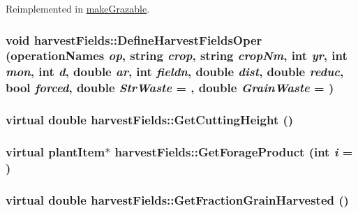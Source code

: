 Reimplemented in \hyperlink{classmake_grazable_a52ff627730636a7a71b975a203edbf5f}{makeGrazable}.\hypertarget{classharvest_fields_aed7f89142c895481212938562ce61f3a}{
\subsubsection[{DefineHarvestFieldsOper}]{\setlength{\rightskip}{0pt plus 5cm}void harvestFields::DefineHarvestFieldsOper ({\bf operationNames} {\em op}, \/  string {\em crop}, \/  string {\em cropNm}, \/  int {\em yr}, \/  int {\em mon}, \/  int {\em d}, \/  double {\em ar}, \/  int {\em fieldn}, \/  double {\em dist}, \/  double {\em reduc}, \/  bool {\em forced}, \/  double {\em StrWaste} = {}, \/  double {\em GrainWaste} = {})}}
\label{classharvest_fields_aed7f89142c895481212938562ce61f3a}
\hypertarget{classharvest_fields_a2f6612b8edd1ad8a89f5df4890b990c7}{
\subsubsection[{GetCuttingHeight}]{\setlength{\rightskip}{0pt plus 5cm}virtual double harvestFields::GetCuttingHeight ()}}
\label{classharvest_fields_a2f6612b8edd1ad8a89f5df4890b990c7}
\hypertarget{classharvest_fields_a8eea5e22cb934b9582c5bd168135390b}{
\subsubsection[{GetForageProduct}]{\setlength{\rightskip}{0pt plus 5cm}virtual {\bf plantItem}$\ast$ harvestFields::GetForageProduct (int {\em i} = {})}}
\label{classharvest_fields_a8eea5e22cb934b9582c5bd168135390b}
\hypertarget{classharvest_fields_adc76919fe377000c2c48276227cfd6ca}{
\subsubsection[{GetFractionGrainHarvested}]{\setlength{\rightskip}{0pt plus 5cm}virtual double harvestFields::GetFractionGrainHarvested ()}}
